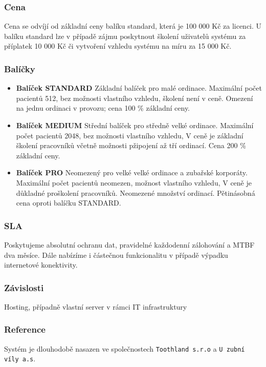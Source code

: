 \documentclass[11pt, a4paper, titlepage]{article}
\begin{document}
	\subsubsection*{Cena}
	\noindent Cena se odvíjí od základní ceny balíku standard, která je 100 000 Kč za licenci. U balíku standard lze v případě zájmu poskytnout školení uživatelů systému za příplatek 10 000 Kč či vytvoření vzhledu systému na míru za 15 000 Kč.

	\subsubsection*{Balíčky}

	\begin{itemize}		
		\item \textbf{Balíček STANDARD} Základní balíček pro malé ordinace. Maximální počet pacientů 512, bez možnosti vlastního vzhledu, školení není v ceně. Omezení na jednu ordinaci v provozu; cena 100 \% základní ceny.

		\item \textbf{Balíček MEDIUM} Střední balíček pro středně velké ordinace. Maximální počet pacientů 2048, bez možnosti vlastního vzhledu, V ceně je základní školení pracovníků včetně možnosti pžipojení až tří ordinací. Cena 200 \% základní ceny.

		\item \textbf{Balíček PRO} Neomezený pro velké velké ordinace a zubařské korporáty. Maximální počet pacientů neomezen, možnost vlastního vzhledu, V ceně je důkladné proškolení pracovníků. Neomezené množství ordinací. Pětinásobná cena oproti balíčku STANDARD.
	\end{itemize}

	\subsubsection*{SLA}

	Poskytujeme absolutní ochranu dat, pravidelné každodenní zálohování a MTBF dva měsíce. Dále nabízíme i částečnou funkcionalitu v případě výpadku internetové konektivity.

	\subsubsection*{Závislosti}

	Hosting, případně vlastní server v rámci IT infrastruktury

	\subsubsection*{Reference}
	Systém je dlouhodobě nasazen ve společnostech \texttt{Toothland s.r.o} a \texttt{U zubní víly a.s}.
\end{document}
